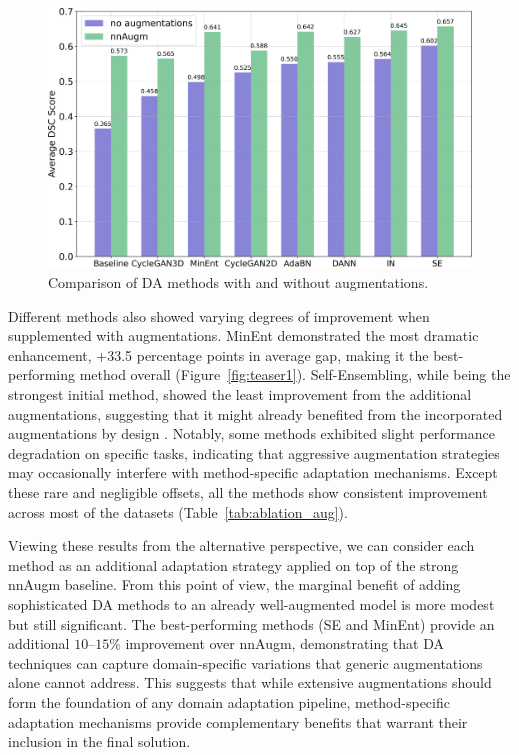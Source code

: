 \begin{figure}[h]
	\centering
	\includegraphics[width=1\linewidth]{Dissertation/Figures/4_da_bench/augm.png}
	\caption{Comparison of DA methods with and without augmentations.}
	\label{fig:augm}
\end{figure}

Different methods also showed varying degrees of improvement when supplemented with augmentations. MinEnt demonstrated the most dramatic enhancement, +33.5 percentage points in average gap, making it the best-performing method overall (Figure~\ref{fig:teaser1}). Self-Ensembling, while being the strongest initial method, showed the least improvement from the additional augmentations, suggesting that it might already benefited from the incorporated augmentations by design \cite{se_medim}. Notably, some methods exhibited slight performance degradation on specific tasks, indicating that aggressive augmentation strategies may occasionally interfere with method-specific adaptation mechanisms. Except these rare and negligible offsets, all the methods show consistent improvement across most of the datasets (Table~\ref{tab:ablation_aug}).


%


Viewing these results from the alternative perspective, we can consider each method as an additional adaptation strategy applied on top of the strong nnAugm baseline. From this point of view, the marginal benefit of adding sophisticated DA methods to an already well-augmented model is more modest but still significant. The best-performing methods (SE and MinEnt) provide an additional $10$--$15\%$ improvement over nnAugm, demonstrating that DA techniques can capture domain-specific variations that generic augmentations alone cannot address. This suggests that while extensive augmentations should form the foundation of any domain adaptation pipeline, method-specific adaptation mechanisms provide complementary benefits that warrant their inclusion in the final solution.

